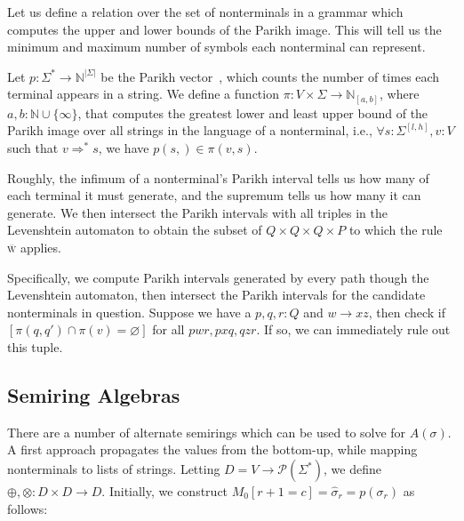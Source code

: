 \documentclass[sigplan,review,anonymous,acmsmall]{acmart}\settopmatter{printfolios=false,printccs=false,printacmref=false}
\begin{document}
  Let us define a relation over the set of nonterminals in a grammar which computes the upper and lower bounds of the Parikh image. This will tell us the minimum and maximum number of symbols each nonterminal can represent.

  \begin{definition}
    Let $p: \Sigma^*\rightarrow\mathbb{N}^{|\Sigma|}$ be the Parikh vector~\cite{parikh1966context}, which counts the number of times each terminal appears in a string. We define a function $\pi: V \times \Sigma \rightarrow \mathbb{N}_{[a, b]}$, where $a, b: \mathbb{N} \cup \{\infty\}$, that computes the greatest lower and least upper bound of the Parikh image over all strings in the language of a nonterminal, i.e., $\forall s: \Sigma^{[l, h]}, v: V$ such that $v \Rightarrow^* s$, we have $p(s, ) \in \pi(v, s)$.
  \end{definition}

  Roughly, the infimum of a nonterminal's Parikh interval tells us how many of each terminal it must generate, and the supremum tells us how many it can generate. We then intersect the Parikh intervals with all triples in the Levenshtein automaton to obtain the subset of $Q\times Q\times Q \times P$ to which the rule \textsc{\"w} applies.

  Specifically, we compute Parikh intervals generated by every path though the Levenshtein automaton, then intersect the Parikh intervals for the candidate nonterminals in question. Suppose we have a $p, q, r: Q$ and $w \rightarrow x z$, then check if $[\pi(q, q') \cap \pi(v) = \varnothing]$ for all $pwr, pxq, qzr$. If so, we can immediately rule out this tuple.


  \subsection{Semiring Algebras}

  There are a number of alternate semirings which can be used to solve for $A(\sigma)$. A first approach propagates the values from the bottom-up, while mapping nonterminals to lists of strings. Letting $D = V \rightarrow \mathcal{P}(\Sigma^*)$, we define $\oplus, \otimes: D \times D \rightarrow D$. Initially, we construct $M_0[r+1=c] = \hat\sigma_r = p(\sigma_r)$ as follows:
\end{document}
